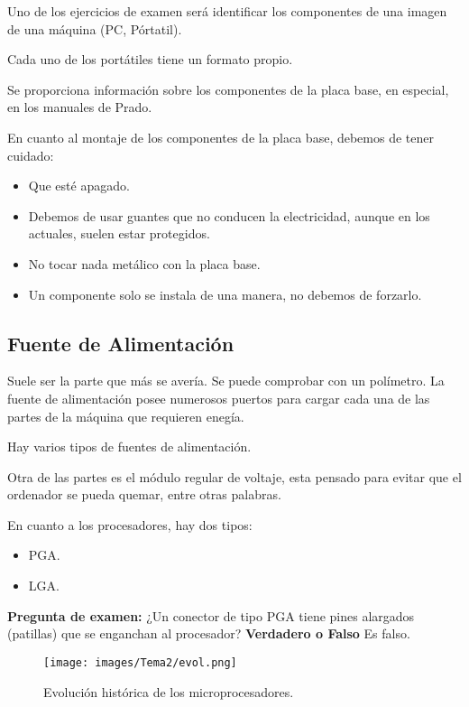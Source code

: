 Uno de los ejercicios de examen será identificar los componentes de una imagen de una máquina (PC, Pórtatil).

Cada uno de los portátiles tiene un formato propio.

Se proporciona información sobre los componentes de la placa base, en especial, en los manuales de Prado.

En cuanto al montaje de los componentes de la placa base, debemos de tener cuidado:
\begin{itemize}
    \item Que esté apagado.
    \item Debemos de usar guantes que no conducen la electricidad, aunque en los actuales, suelen estar protegidos.
    \item No tocar nada metálico con la placa base.
    \item Un componente solo se instala de una manera, no debemos de forzarlo.
\end{itemize}

\subsection{Fuente de Alimentación}

Suele ser la parte que más se avería. Se puede comprobar con un polímetro. La fuente de alimentación posee numerosos puertos para cargar cada una de las partes de la máquina que requieren enegía.

Hay varios tipos de fuentes de alimentación.

Otra de las partes es el módulo regular de voltaje, esta pensado para evitar que el ordenador se pueda quemar, entre otras palabras.

En cuanto a los procesadores, hay dos tipos:
\begin{itemize}
    \item PGA.
    \item LGA.  
\end{itemize}


\begin{tcolorbox}[colback=yellow!5!white,colframe=yellow!75!black]
    \textbf{Pregunta de examen:} ¿Un conector de tipo PGA tiene pines alargados (patillas) que se enganchan al procesador? \textbf{Verdadero o Falso} Es falso.
    
\end{tcolorbox}

\begin{figure}[H]
    \centering
    \texttt{[image: images/Tema2/evol.png]}
    \caption{Evolución histórica de los microprocesadores.}
    \label{fig:1}
\end{figure}

